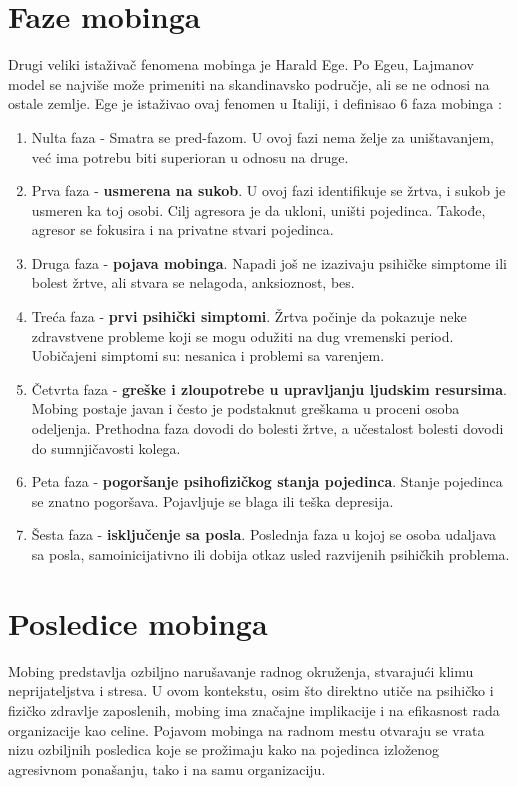 \documentclass[a4paper]{article}
\begin{document}
    \section{Faze mobinga}
    Drugi veliki istaživač fenomena mobinga je Harald Ege. Po Egeu, Lajmanov model se najviše može primeniti na skandinavsko područje, ali se ne odnosi na ostale zemlje. Ege je istaživao ovaj fenomen u Italiji, i definisao 6 faza mobinga \cite{ege2000mobbing}:
    \begin{enumerate}
        \item Nulta faza - Smatra se pred-fazom. U ovoj fazi nema želje za uništavanjem, već ima potrebu biti superioran u odnosu na druge.
        \item Prva faza - \textbf{usmerena na sukob}. U ovoj fazi identifikuje se žrtva, i sukob je usmeren ka toj osobi. Cilj agresora je da ukloni, uništi pojedinca. Takođe, agresor se fokusira i na privatne stvari pojedinca.
        \item Druga faza - \textbf{pojava mobinga}. Napadi još ne izazivaju psihičke simptome ili bolest žrtve, ali stvara se nelagoda, anksioznost, bes.
        \item Treća faza - \textbf{prvi psihički simptomi}. Žrtva počinje da pokazuje neke zdravstvene probleme koji se mogu odužiti na dug vremenski period. Uobičajeni simptomi su: nesanica i problemi sa varenjem.
        \item Četvrta faza - \textbf{greške i zloupotrebe u upravljanju ljudskim resursima}. Mobing postaje javan i često je podstaknut greškama u proceni osoba odeljenja. Prethodna faza dovodi do bolesti žrtve, a učestalost bolesti dovodi do sumnjičavosti kolega.
        \item Peta faza - \textbf{pogoršanje psihofizičkog stanja pojedinca}. Stanje pojedinca se znatno pogoršava. Pojavljuje se blaga ili teška depresija.
        \item Šesta faza - \textbf{isključenje sa posla}. Poslednja faza u kojoj se osoba udaljava sa posla, samoinicijativno ili dobija otkaz usled razvijenih psihičkih problema. 
    \end{enumerate}

    \section{Posledice mobinga}
        Mobing predstavlja ozbiljno narušavanje radnog okruženja, stvarajući klimu neprijateljstva i stresa.
        U ovom kontekstu, osim što direktno utiče na psihičko i fizičko zdravlje zaposlenih, mobing ima značajne implikacije i na efikasnost rada organizacije kao celine.
        Pojavom mobinga na radnom mestu otvaraju se vrata nizu ozbiljnih posledica koje se prožimaju kako na pojedinca izloženog agresivnom ponašanju, tako i na samu organizaciju.
\end{document}
